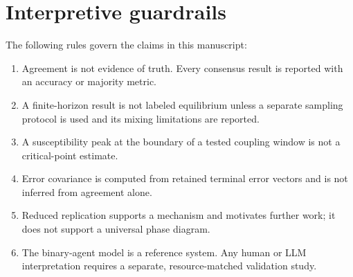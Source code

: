 \documentclass[11pt,a4paper]{article}
\begin{document}
\section{Interpretive guardrails}

The following rules govern the claims in this manuscript:

\begin{enumerate}
  \item Agreement is not evidence of truth. Every consensus result is reported with an accuracy or majority metric.
  \item A finite-horizon result is not labeled equilibrium unless a separate sampling protocol is used and its mixing limitations are reported.
  \item A susceptibility peak at the boundary of a tested coupling window is not a critical-point estimate.
  \item Error covariance is computed from retained terminal error vectors and is not inferred from agreement alone.
  \item Reduced replication supports a mechanism and motivates further work; it does not support a universal phase diagram.
  \item The binary-agent model is a reference system. Any human or LLM interpretation requires a separate, resource-matched validation study.
\end{enumerate}

{}


\end{document}

